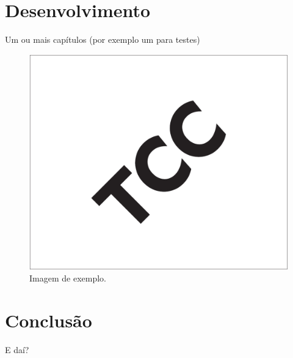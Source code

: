 \documentclass[12pt, %
openright, 
oneside, %
a4paper,    %
brazil]{facom-ufu-abntex2}
\begin{document}
\chapter{Desenvolvimento}
Um ou mais capítulos (por exemplo um para testes)


\begin{figure}[!ht]
    \centering
	\includegraphics[width=0.55\linewidth]{imagemExemplo.pdf}
	\caption[Isso é o que aparece no sumário]{Imagem de exemplo.}
	\label{fig:graficosVariandoTamanhoRede}
\end{figure}



\chapter[Conclusão]{Conclusão}
E daí?





\postextual





\end{document}
